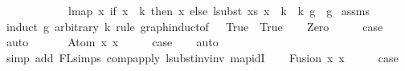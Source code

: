 \begin{isabellebody}
\ \ \ \ \ \ \ \ \ \ \ \ {\isacharparenleft}{\kern0pt}lmap\ {\isacharparenleft}{\kern0pt}{\isasymlambda}x{\isachardot}{\kern0pt}\ if\ x\ {\isacharless}{\kern0pt}\ k\ then\ x\ else\ {\isacharparenleft}{\kern0pt}lsubst\ xs\ {\isacharparenleft}{\kern0pt}x\ {\isacharminus}{\kern0pt}\ k{\isacharparenright}{\kern0pt}\ {\isacharplus}{\kern0pt}\ k{\isacharparenright}{\kern0pt}{\isacharparenright}{\kern0pt}\ g{\isacharparenright}{\kern0pt}\ {\isacharequal}{\kern0pt}\ g{\isachardoublequoteclose}\isanewline
%
\isadelimproof
%
\endisadelimproof
%
\isatagproof
{}\isamarkupfalse%
\ assms\isanewline
{}\isamarkupfalse%
\ {\isacharparenleft}{\kern0pt}induct\ g\ arbitrary{\isacharcolon}{\kern0pt}\ k\ rule{\isacharcolon}{\kern0pt}\ graph{\isachardot}{\kern0pt}induct{\isacharbrackleft}{\kern0pt}of\ {\isacharunderscore}{\kern0pt}\ {\isachardoublequoteopen}{\isacharpercent}{\kern0pt}{\isacharunderscore}{\kern0pt}{\isachardot}{\kern0pt}\ True{\isachardoublequoteclose}\ {\isachardoublequoteopen}{\isacharpercent}{\kern0pt}{\isacharunderscore}{\kern0pt}{\isachardot}{\kern0pt}\ True{\isachardoublequoteclose}{\isacharbrackright}{\kern0pt}{\isacharparenright}{\kern0pt}\isanewline
\ \ \isamarkupfalse%
\ Zero\isanewline
\ \ \isamarkupfalse%
\ \isamarkupfalse%
\ {\isacharquery}{\kern0pt}case\isanewline
\ \ \isamarkupfalse%
\ auto\isanewline
\ \ \isamarkupfalse%
\isanewline
{}\isamarkupfalse%
\isanewline
\ \ \isamarkupfalse%
\ {\isacharparenleft}{\kern0pt}Atom\ x{}\ x{}{\isacharparenright}{\kern0pt}\isanewline
\ \ \isamarkupfalse%
\ \isamarkupfalse%
\ {\isacharquery}{\kern0pt}case\isanewline
\ \ \isamarkupfalse%
\ auto\isanewline
\ \ \isamarkupfalse%
\ {\isacharparenleft}{\kern0pt}simp\ add{\isacharcolon}{\kern0pt}\ FL{\isachardot}{\kern0pt}simps{\isacharparenleft}{\kern0pt}{}{\isacharparenright}{\kern0pt}\ comp{\isacharunderscore}{\kern0pt}apply\ lsubst{\isacharunderscore}{\kern0pt}inv{\isacharunderscore}{\kern0pt}inv{}\ map{\isacharunderscore}{\kern0pt}idI{\isacharparenright}{\kern0pt}\isanewline
{}\isamarkupfalse%
\isanewline
\ \ \isamarkupfalse%
\ {\isacharparenleft}{\kern0pt}Fusion\ x{}\ x{}{\isacharparenright}{\kern0pt}\isanewline
\ \ \isamarkupfalse%
\ \isamarkupfalse%
\ {\isacharquery}{\kern0pt}case\isanewline

\end{isabellebody}
